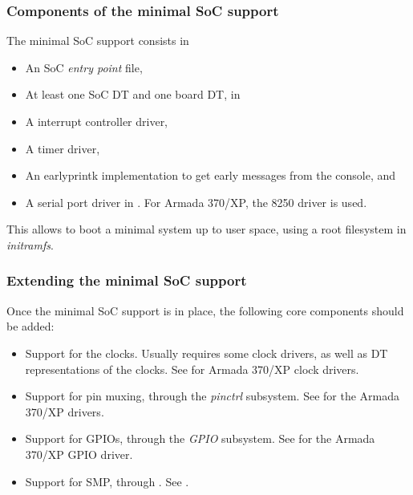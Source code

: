 \begin{frame}
  \frametitle{Components of the minimal SoC support}
  The minimal SoC support consists in
  \footnotesize
  \begin{itemize}
  \item An SoC {\em entry point} file,
  \item At least one SoC  DT and one board  DT,
    in 
  \item A interrupt controller driver,
  \item A timer driver,
  \item An earlyprintk implementation to get early messages from the
    console,  and
  \item A serial port driver in . For Armada
    370/XP, the 8250 driver  is used.
  \end{itemize}
  \normalsize
  This allows to boot a minimal system up to user space, using a root
  filesystem in {\em initramfs}.
\end{frame}

\begin{frame}
  \frametitle{Extending the minimal SoC support}

  Once the minimal SoC support is in place, the following core
  components should be added:
  \begin{itemize}
  \item Support for the clocks. Usually requires some clock drivers,
    as well as DT representations of the clocks. See
     for Armada 370/XP clock drivers.
  \item Support for pin muxing, through the {\em pinctrl}
    subsystem. See  for the Armada 370/XP
    drivers.
  \item Support for GPIOs, through the {\em GPIO} subsystem. See
     for the Armada 370/XP GPIO
    driver.
  \item Support for SMP, through . See
    .
  \end{itemize}
\end{frame}

